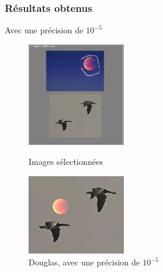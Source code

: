 \subsubsection{Résultats obtenus}
Avec une précision de $10^{-5}$

\begin{figure}[!htb]
   \begin{minipage}{0.5\textwidth}
     \centering
     \includegraphics[width = 120pt]{Images/Resultats/Douglas1b.png}
     \caption{Images sélectionnées}
      \end{minipage}\hfill
   \begin{minipage}{0.5\textwidth}
     \centering
     \includegraphics[width = 120pt]{Images/Resultats/Douglas1.png}
     \caption{Douglas, avec une précision de $10^{-5}$}
      \end{minipage}\hfill
\end{figure}
